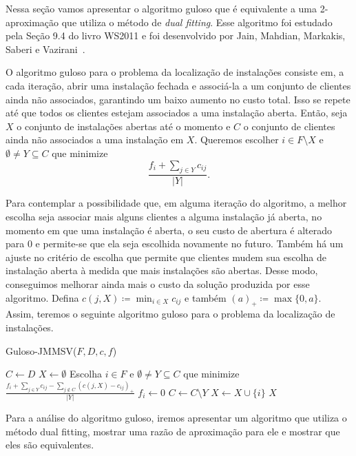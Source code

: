 Nessa seção vamos apresentar o algoritmo guloso que é equivalente a uma 2-aproximação que utiliza o método de \emph{dual fitting}. Esse algoritmo foi estudado pela Seção 9.4 do livro WS2011 e foi desenvolvido por Jain, Mahdian, Markakis, Saberi e Vazirani~\cite{jain2002greedy}.

O algoritmo guloso para o problema da localização de instalações consiste em, a cada iteração, abrir uma instalação fechada e associá-la a um conjunto de clientes ainda não associados, garantindo um baixo aumento no custo total. 
Isso se repete até que todos os clientes estejam associados a uma instalação aberta. Então, seja $X$ o conjunto de instalações abertas até o momento e $C$ o conjunto de clientes ainda não associados a uma instalação em $X$. Queremos escolher $i \in F \setminus X$ e $\emptyset \neq Y \subseteq C$ que minimize
\[ \frac{f_i + \sum_{j \in Y} c_{ij}}{|Y|}.
    \] 

Para contemplar a possibilidade que, em alguma iteração do algoritmo, a melhor escolha seja associar mais alguns clientes a alguma instalação já aberta, no momento em que uma instalação é aberta, o seu custo de abertura é alterado para 0 e permite-se que ela seja escolhida novamente no futuro. Também há um ajuste no critério de escolha que permite que clientes mudem sua escolha de instalação aberta à medida que mais instalações são abertas. Desse modo, conseguimos melhorar ainda mais o custo da solução produzida por esse algoritmo. Defina $c(j,X) \coloneqq \min_{i \in X} c_{ij}$ e também $(a)_+\coloneqq\max\{0,a\}$. Assim, teremos o seguinte algoritmo guloso para o problema da localização de instalações.
\begin{algorithm}
    \caption{\sc Guloso-JMMSV($F,D,c,f$)}
    \begin{algorithmic}[1]
        \State $C \gets D$
        \State $X \gets \emptyset$
        \State Escolha $i \in F$ e $\emptyset \neq Y \subseteq C$ que minimize $\frac{f_i + \sum_{j \in Y}c_{ij} - \sum_{j \not \in C}(c(j,X) - c_{ij})_+ }{|Y|}$
        \State $f_i \gets 0$
        \State $C \gets C \setminus Y$
        \State $X \gets X \cup \{i\}$
        \EndWhile
        \State \Return $X$
    \end{algorithmic}
\end{algorithm}

Para a análise do algoritmo guloso, iremos apresentar um algoritmo que utiliza o método dual fitting, mostrar uma razão de aproximação para ele e mostrar que eles são equivalentes.


